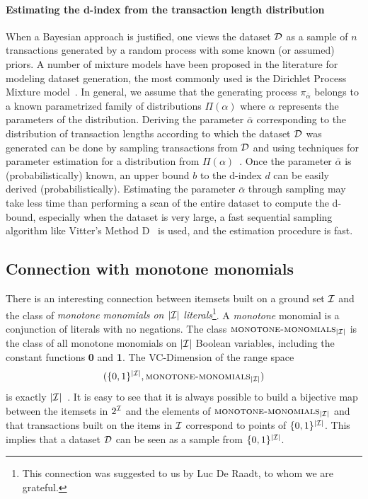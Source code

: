 \paragraph{Estimating the d-index from the transaction length distribution} When
a Bayesian approach is justified, one views the dataset ${\cal D}$ as a sample of $n$
transactions generated by a random process with some known (or assumed) priors.
A number of mixture models have been proposed in the literature for modeling
dataset generation, the most commonly used is the Dirichlet Process Mixture
model~\citep{HeS12}.
In general, we assume that the generating process 
$\pi_{\bar{\alpha}}$ belongs to a known parametrized family of distributions
$\Pi(\alpha)$ where $\alpha$ represents the parameters of the distribution.
Deriving the parameter $\bar\alpha$ corresponding to the distribution of
transaction lengths according to which the dataset ${\cal D}$ was generated can be
done by sampling transactions from ${\cal D}$ and using techniques for parameter
estimation for a distribution from $\Pi(\alpha)$~\citep{LehmannC98,HastieTF09}.
Once the parameter $\bar\alpha$ is (probabilistically) known, an upper bound $b$
to the d-index $d$ can be easily derived (probabilistically).  
Estimating the parameter $\bar\alpha$ through sampling may take less time than
performing a scan of the entire dataset to compute the d-bound, especially when
the dataset is very large, a fast sequential sampling algorithm like Vitter's
Method D~\citep{Vitter87} is used, and the estimation procedure is fast.

\subsection{Connection with monotone monomials}\label{sec:vcminemonomials}
There is an interesting connection between itemsets built on a ground set
${\cal I}$ and 
the class of \emph{monotone monomials on $|{\cal I}|$ literals}\footnote{This
connection was suggested to us by Luc De Raadt, to whom we are grateful.}. 
A \emph{monotone} monomial is a conjunction of literals with no negations. The
class $\textsc{monotone-monomials}_{|{\cal I}|}$ is the class of
all monotone monomials on $|{\cal I}|$ Boolean variables, including the constant functions
{\bf 0} and {\bf 1}. The VC-Dimension of the range space
\[
(\{0,1\}^{|{\cal I}|},\textsc{monotone-monomials}_{|{\cal I}|})\]
is exactly $|{\cal I}|$~\cite[Coroll.~3]{NatschlagerS96}. It is easy to see that it is always
possible to build a bijective map between the itemsets in $2^{\cal I}$ and the
elements of $\textsc{monotone-monomials}_{|{\cal I}|}$ and that transactions built
on the items in ${\cal I}$ correspond to points of $\{0,1\}^{|{\cal I}|}$. This implies
that a dataset ${\cal D}$ can be seen as a sample from $\{0,1\}^{|{\cal I}|}$.

